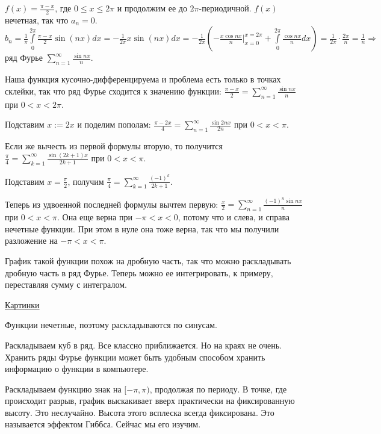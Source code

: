 \begin{example}
    $f(x) = \frac{\pi - x}{2}$, где $0 \le x \le 2 \pi$ и продолжим ее до $2 \pi$-периодичной.
    $f(x)$ нечетная, так что $a_n = 0$.
    $b_n = \frac{1}{\pi} \int \limits_{0}^{2 \pi} \frac{\pi - x}{2} \sin (nx) dx = -\frac{1}{2 \pi} x \sin (nx) dx =
        -\frac{1}{2 \pi} (-\frac{x \cos nx}{n} \bigr|_{x = 0}^{x = 2 \pi} + \int \limits_{0}^{2 \pi} \frac{\cos nx}{n} dx) = \frac{1}{2 \pi} \cdot \frac{2 \pi}{n} = \frac{1}{n} \Rightarrow$ ряд Фурье $\sum \limits_{n = 1}^{\infty} \frac{\sin nx}{n}$.

    Наша функция кусочно-дифференцируема и проблема есть только в точках склейки, так что ряд Фурье сходится к значению функции:
    $\frac{\pi - x}{2} = \sum \limits_{n = 1}^{\infty} \frac{\sin nx}{n}$ при $0 < x < 2 \pi$.

    Подставим $x := 2x$ и поделим пополам:
    $\frac{\pi - 2x}{4} = \sum \limits_{n = 1}^{\infty} \frac{\sin 2nx}{2n}$ при $0 < x < \pi$.

    Если же вычесть из первой формулы вторую, то получится
    $\frac{\pi}{4} = \sum \limits_{k = 1}^{\infty} \frac{\sin (2k + 1) x}{2k + 1}$ при $0 < x < \pi$.

    Подставим $x = \frac{\pi}{2}$, получим
    $\frac{\pi}{4} = \sum \limits_{k = 1}^{\infty}\frac{(-1)^k}{2k + 1}$.

    Теперь из удвоенной последней формулы вычтем первую:
    $\frac{x}{2} = \sum \limits_{n = 1}^{\infty}\frac{(-1)^n \sin nx}{n}$ при $0 < x < \pi$.
    Она еще верна при $-\pi < x < 0$, потому что и слева, и справа нечетные функции. При этом в нуле она тоже верна, так что мы получили разложение на $-\pi < x < \pi$.

    График такой функции похож на дробную часть, так что можно раскладывать дробную часть в ряд Фурье. Теперь можно ее интегрировать, к примеру, переставляя сумму с интегралом.

    \href{https://youtu.be/ngQduNsEq3E?list=PLodheWE7A8z9ri1dXoa9rGn6TgpdWtGlt&t=6241}{Картинки}

    Функции нечетные, поэтому раскладываются по синусам.

    Раскладываем куб в ряд. Все классно приближается. Но на краях не очень. Хранить ряды Фурье функции может быть удобным способом хранить информацию о функции в компьютере.

    Раскладываем функцию знак на $[-\pi, \pi)$, продолжая по периоду.
    В точке, где происходит разрыв, график выскакивает вверх практически на фиксированную высоту. Это неслучайно. Высота этого всплеска всегда фиксирована.
    Это называется эффектом Гиббса. Сейчас мы его изучим.



\end{example}
